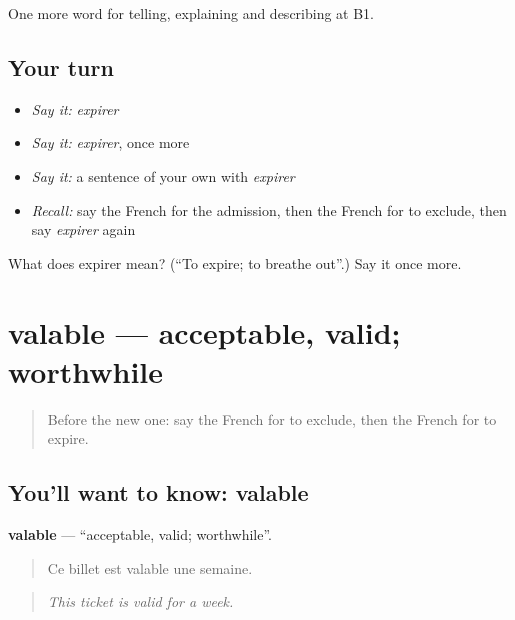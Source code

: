 \begin{grammarlens}[title={What you've built}]
One more word for telling, explaining and describing at B1.
\end{grammarlens}

\subsection*{Your turn}
\begin{itemize}
\raggedright
  \item \emph{Say it:} \emph{expirer}
  \item \emph{Say it:} \emph{expirer}, once more
  \item \emph{Say it:} a sentence of your own with \emph{expirer}
  \item \emph{Recall:} say the French for the admission, then the French for to exclude, then say \emph{expirer} again
\end{itemize}

\begin{tcolorbox}[breakable,colback=teal!4,colframe=teal!35!black,title={Before you move on}]
What does expirer mean? (\textquotedblleft{}To expire; to breathe out\textquotedblright{}.) Say it once more.
\end{tcolorbox}
\section[valable]{valable — acceptable, valid; worthwhile}

\label{lesson:FR-C384-valable}



\begin{quote}
Before the new one: say the French for to exclude, then the French for to expire.
\end{quote}

\subsection*{You'll want to know: valable}
\textbf{valable} — \textquotedblleft{}acceptable, valid; worthwhile\textquotedblright{}.

\begin{quote}
Ce billet est valable une semaine.
\end{quote}

\begin{quote}
\emph{This ticket is valid for a week.}
\end{quote}

